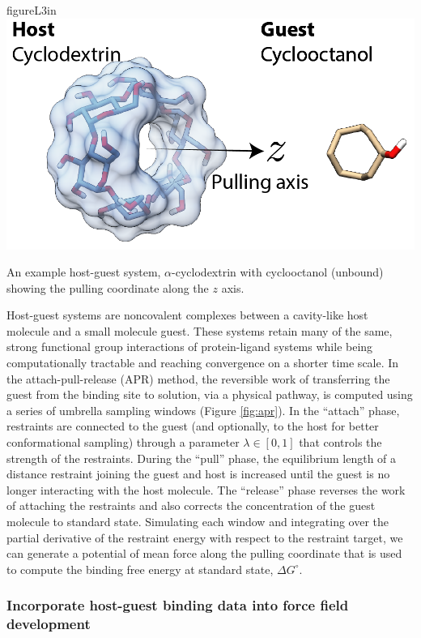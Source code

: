 \documentclass[11pt,notitlepage]{article}
\begin{document}
\begin{wrapfloat}{figure}{L}{3in}
\centering
\includegraphics{content/images/APR-annotated.png}
\caption{An example host-guest system, \(\alpha\)-cyclodextrin with
cyclooctanol (unbound) showing the pulling coordinate along the \(z\)
axis.}
\label{fig:apr}
\end{wrapfloat}

Host-guest systems are noncovalent complexes between a cavity-like host
molecule and a small molecule guest. These systems retain many of the
same, strong functional group interactions of protein-ligand systems
while being computationally tractable and reaching convergence on a
shorter time scale. In the attach-pull-release (APR) method, the
reversible work of transferring the guest from the binding site to
solution, via a physical pathway, is computed using a series of umbrella
sampling windows (Figure \ref{fig:apr}). In the ``attach'' phase,
restraints are connected to the guest (and optionally, to the host for
better conformational sampling) through a parameter
\(\lambda \in [0, 1]\) that controls the strength of the restraints.
During the ``pull'' phase, the equilibrium length of a distance
restraint joining the guest and host is increased until the guest is no
longer interacting with the host molecule. The ``release'' phase
reverses the work of attaching the restraints and also corrects the
concentration of the guest molecule to standard state. Simulating each
window and integrating over the partial derivative of the restraint
energy with respect to the restraint target, we can generate a potential
of mean force along the pulling coordinate that is used to compute the
binding free energy at standard state, \(\Delta G^\circ\).

\hypertarget{incorporate-host-guest-binding-data-into-force-field-development-1}{%
\subsubsection{Incorporate host-guest binding data into force field
development}\label{incorporate-host-guest-binding-data-into-force-field-development-1}}
\end{document}
